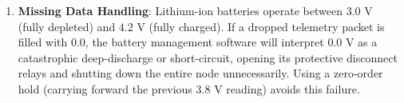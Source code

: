\begin{enumerate}
    \item \textbf{Missing Data Handling}:
    Lithium-ion batteries operate between $3.0\text{ V}$ (fully depleted) and $4.2\text{ V}$ (fully charged). If a dropped telemetry packet is filled with $0.0$, the battery management software will interpret $0.0\text{ V}$ as a catastrophic deep-discharge or short-circuit, opening its protective disconnect relays and shutting down the entire node unnecessarily. Using a zero-order hold (carrying forward the previous $3.8\text{ V}$ reading) avoids this failure.
\end{enumerate}
